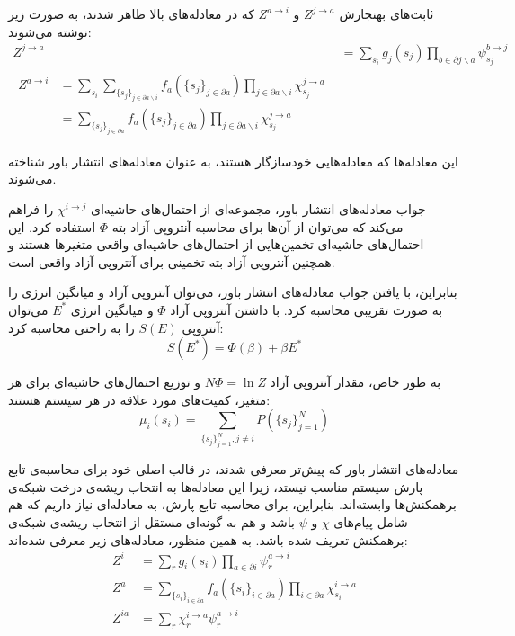\begin{appendices}
    ثابت‌های بهنجارش
    \( Z^{j \to a} \) و \( Z^{a \to i} \)
    که در معادله‌های بالا ظاهر شدند، به صورت زیر نوشته می‌شوند:
    \begin{align}
        Z^{j \to a} & = \sum_{s_i} g_j(s_j) \prod_{b \in \partial j \backslash a} \psi_{s_{j}}^{b \to j} \\
        \begin{split}
            Z^{a \to i} & = \sum_{s_{i}} \sum_{\{ s_{j} \}_{j \in \partial a \backslash i}} f_{a} \left( \{ s_{j} \}_{j \in \partial a} \right) \prod_{j \in \partial a \backslash i} \chi_{s_{j}}^{j \to a} \\
                        & = \sum_{\{ s_{j} \}_{j \in \partial a}} f_{a} \left( \{ s_{j} \}_{j \in \partial a} \right) \prod_{j \in \partial a \backslash i} \chi_{s_{j}}^{j \to a}
        \end{split}
    \end{align}

    این معادله‌ها که معادله‌هایی خودسازگار هستند، به عنوان معادله‌های انتشار باور شناخته می‌شوند.

    جواب معادله‌های انتشار باور، مجموعه‌ای از احتمال‌های حاشیه‌ای
    \( \chi^{i \to j} \)
    را فراهم می‌کند که می‌توان از آن‌ها برای محاسبه آنتروپی آزاد بته
    \( \Phi \)
    استفاده کرد.
    این احتمال‌های حاشیه‌ای تخمین‌هایی از احتمال‌های حاشیه‌ای واقعی متغیرها هستند و همچنین آنتروپی آزاد بته تخمینی برای آنتروپی آزاد واقعی است.

    بنابراین، با یافتن جواب معادله‌های انتشار باور، می‌توان آنتروپی آزاد و میانگین انرژی را به صورت تقریبی محاسبه کرد.
    با داشتن آنتروپی آزاد
    \( \Phi \)
    و میانگین انرژی
    \( E^{*} \)
    می‌توان آنتروپی
    \( S(E) \)
    را به راحتی محاسبه کرد:
    \[ S(E^{*}) = \Phi(\beta) + \beta E^{*} \]

    به طور خاص، مقدار آنتروپی آزاد
    \( N \Phi = \ln Z \)
    و توزیع احتمال‌های حاشیه‌ای برای هر متغیر، کمیت‌های مورد علاقه در هر سیستم هستند:
    \[ \mu_{i}(s_{i}) = \sum_{\{ s_{j} \}_{j=1}^{N}, j \ne i} P \left( \{ s_{j} \}_{j=1}^{N} \right) \]

    معادله‌های انتشار باور که پیش‌تر معرفی شدند، در قالب اصلی خود برای محاسبه‌ی تابع پارش سیستم مناسب نیستد، زیرا این معادله‌ها به انتخاب ریشه‌ی درخت شبکه‌ی برهمکنش‌ها وابسته‌اند.
    بنابراین، برای محاسبه تابع پارش، به معادله‌ای نیاز داریم که هم شامل پیام‌های
    \( \chi \) و \( \psi \)
    باشد و هم به گونه‌ای مستقل از انتخاب ریشه‌ی شبکه‌ی برهمکنش تعریف شده باشد.
    به همین منظور، معادله‌های زیر معرفی شده‌اند:
    \begin{align}
        \label{eq:z_variable}
        Z^{i}  & = \sum_{r} g_{i}(s_{i}) \prod_{a \in \partial i} \psi_{r}^{a \to i}                                                           \\
        Z^{a}  & = \sum_{\{ s_{i} \}_{i \in \partial a}} f_{a}(\{ s_{i} \}_{i \in \partial a}) \prod_{i \in \partial a} \chi_{s_{i}}^{i \to a} \\
        Z^{ia} & = \sum_{r} \chi_{r}^{i \to a} \psi_{r}^{a \to i}
    \end{align}


\end{appendices}

